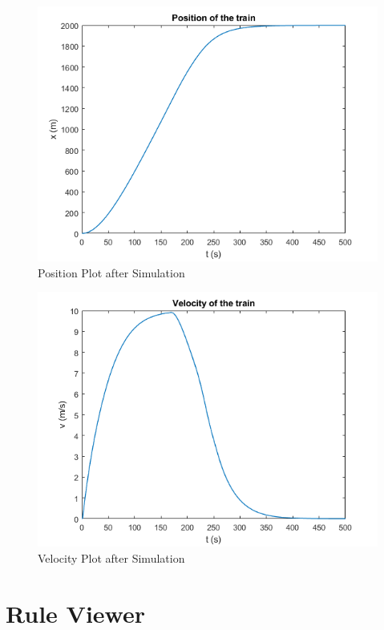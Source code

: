 \begin{figure}[h]
	\centering
	\includegraphics[width=0.9\linewidth]{images/position.png}
	\caption{Position Plot after Simulation}
	\label{x}
\end{figure}
\newpage



\begin{figure}[h]
	\centering
	\includegraphics[width=0.9\linewidth]{images/velocity.png}
	\caption{Velocity Plot after Simulation}
	\label{v}
\end{figure}


\section{Rule Viewer}

